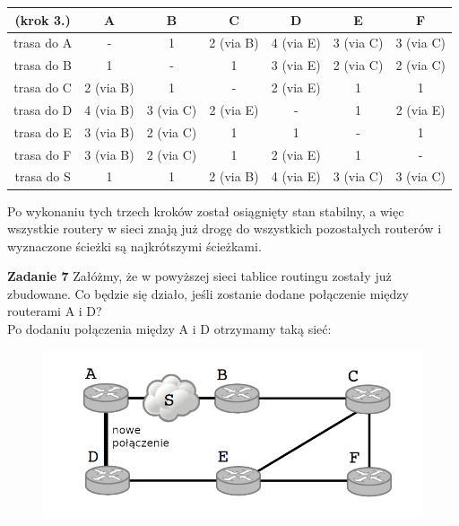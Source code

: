 \documentclass[a4paper,12pt]{article}
\begin{document}
\begin{center}
    \begin{tabular}{|c|c|c|c|c|c|c|}
        \hline
        (krok 3.)   & A         & B         & C         & D         & E         & F         \\ \hline
        trasa do A  & -         & 1         & 2 (via B) & 4 (via E) & 3 (via C) & 3 (via C) \\ \hline
        trasa do B  & 1         & -         & 1         & 3 (via E) & 2 (via C) & 2 (via C) \\ \hline
        trasa do C  & 2 (via B) & 1         & -         & 2 (via E) & 1         & 1         \\ \hline
        trasa do D  & 4 (via B) & 3 (via C) & 2 (via E) & -         & 1         & 2 (via E) \\ \hline
        trasa do E  & 3 (via B) & 2 (via C) & 1         & 1         & -         & 1         \\ \hline
        trasa do F  & 3 (via B) & 2 (via C) & 1         & 2 (via E) & 1         & -         \\ \hline
        trasa do S  & 1         & 1         & 2 (via B) & 4 (via E) & 3 (via C) & 3 (via C) \\ \hline
    \end{tabular}
\end{center}

\noindent Po wykonaniu tych trzech kroków został osiągnięty stan stabilny, a więc
wszystkie routery w sieci znają już drogę do wszystkich pozostałych routerów 
i wyznaczone ścieżki są najkrótszymi ścieżkami.

\noindent \newline \textbf{Zadanie 7} \newline
Załóżmy, że w powyższej sieci tablice routingu zostały już zbudowane. Co będzie
się działo, jeśli zostanie dodane połączenie między routerami A i D? \\

\noindent Po dodaniu połączenia między A i D otrzymamy taką sieć:
\begin{figure}[H]
    \includegraphics[width=\textwidth]{Pomocnicze/zadanie07.png}
\end{figure}
\end{document}
